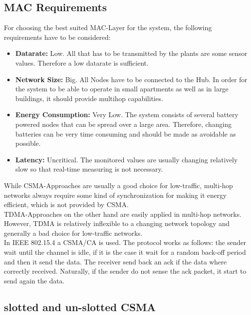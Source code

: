 \subsection{MAC Requirements}
For choosing the best suited MAC-Layer for the system, the following requirements have to be considered:

\begin{itemize}
	\item \textbf{Datarate:}
	Low. All that has to be transmitted by the plants are some sensor values. Therefore a low datarate is sufficient.
	\item \textbf{Network Size:}
	Big. All Nodes have to be connected to the Hub. In order for the system to be able to operate in small apartments as well as in large buildings, it should provide multihop capabilities.
	\item \textbf{Energy Consumption:}
	Very Low. The system consists of several battery powered nodes that can be spread over a large area. Therefore, changing batteries can be very time consuming and should be made as avoidable as possible.
	\item \textbf{Latency:}
	Uncritical. The monitored values are usually changing relatively slow so that real-time measuring is not necessary.
\end{itemize}

While CSMA-Approaches are usually a good choice for low-traffic, multi-hop networks always require some kind of synchronization for making it energy efficient, which is not provided by CSMA.\\
TDMA-Approaches on the other hand are easily applied in multi-hop networks. However, TDMA is relatively inflexible to a changing network topology and generally a bad choice for low-traffic networks.\\
In IEEE 802.15.4 a CSMA/CA is used. The protocol works as follows:
the sender wait until the channel is idle, if it is the case it wait for a random back-off period and then it send the data. The receiver send back an ack if the data where correctly received. Naturally, if the sender do not sense the ack packet, it start to send again the data.\cite{slide}\\

\subsection{slotted and un-slotted CSMA}

